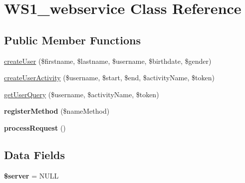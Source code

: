 \hypertarget{class_w_s1__webservice}{\section{W\+S1\+\_\+webservice Class Reference}
\label{class_w_s1__webservice}
}
\subsection*{Public Member Functions}
\begin{DoxyCompactItemize}
\item 
\hyperlink{class_w_s1__webservice_a1b62ed1851f70edfd18f49d06e68dc50}{create\+User} (\$firstname, \$lastname, \$username, \$birthdate, \$gender)
\item 
\hyperlink{class_w_s1__webservice_a6546d97dda46091660111f56f0740b87}{create\+User\+Activity} (\$username, \$start, \$end, \$activity\+Name, \$token)
\item 
\hyperlink{class_w_s1__webservice_ac6205c0eeff28a018e749336e55b084d}{get\+User\+Query} (\$username, \$activity\+Name, \$token)
\item 
\hypertarget{class_w_s1__webservice_ab93521bcae8c90f705635a5788ce1def}{{\bfseries register\+Method} (\$name\+Method)}\label{class_w_s1__webservice_ab93521bcae8c90f705635a5788ce1def}

\item 
\hypertarget{class_w_s1__webservice_a3c934047380a0debb627d77d51bb85c8}{{\bfseries process\+Request} ()}\label{class_w_s1__webservice_a3c934047380a0debb627d77d51bb85c8}

\end{DoxyCompactItemize}
\subsection*{Data Fields}
\begin{DoxyCompactItemize}
\item 
\hypertarget{class_w_s1__webservice_ad135cc8a47e55f0829949cf62214170f}{{\bfseries \$server} = N\+U\+L\+L}\label{class_w_s1__webservice_ad135cc8a47e55f0829949cf62214170f}

\end{DoxyCompactItemize}


